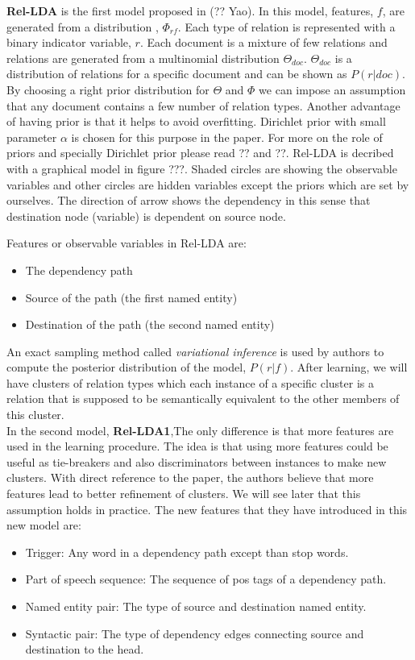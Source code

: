 \documentclass[12pt]{report}
\begin{document}
\textbf{Rel-LDA} is the first model proposed in (?? Yao). 
In this model, features, $f$, are generated from a distribution , $\Phi_{rf}$. Each type
 of relation is represented with a binary indicator variable, $r$. Each document is a mixture of few relations
  and relations are generated from a multinomial distribution $\Theta_{doc}$. $\Theta_{doc}$ is a distribution
  of relations for a specific document and can be shown as $P(r|doc)$. By choosing a right prior distribution for $\Theta$
   and $\Phi$ we can impose an assumption that any document contains a few number of relation types. 
   Another advantage of having prior is that it helps to avoid overfitting. Dirichlet prior with small parameter $\alpha$ is 
   chosen for this purpose in the paper. For more on the role of priors and specially Dirichlet prior
    please read ?? and ??.
    Rel-LDA is decribed with a graphical model in figure ???.
    Shaded circles are showing the observable variables and other circles are hidden variables except 
    the priors which are set by ourselves. The direction of arrow shows the dependency in this sense 
    that destination node (variable) is dependent on source node.
      
    Features or observable variables in Rel-LDA are:
    \begin{itemize}
      \item The dependency path
      \item Source of the path (the first named entity)
      \item Destination of the path (the second named entity)
    \end{itemize}
   	
   	An exact sampling method called \emph{variational inference} is used by authors to compute 
   	the posterior distribution of the model, $P(r|f)$.
   	After learning, we will have clusters of relation types which each instance of a specific cluster 
   	is a relation that is supposed to be semantically equivalent to the other members of this cluster.
   	\\
   	
   	In the second model, \textbf{Rel-LDA1},The only difference is that  more features are used in the learning procedure.
   	 The idea is that using more features could be useful as tie-breakers and also discriminators between instances
   	  to make new clusters. With direct reference to the paper, the authors believe that more features 
   	  lead to better refinement of clusters. We will see later that this assumption holds in practice.
   	   The new features that they have introduced in this new model are:
   	   \begin{itemize}
   	     \item Trigger: Any word in a dependency path except than stop words. 
   	     \item Part of speech sequence: The sequence of pos tags of a dependency path. 
   	     \item Named entity pair: The type of source and destination named entity.
   	     \item Syntactic pair: The type of dependency edges connecting source and destination to the head.
   	   \end{itemize}   
   
\end{document}
